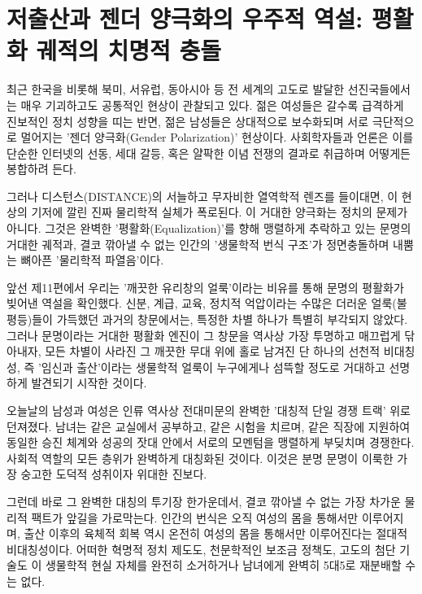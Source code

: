 

\section{저출산과 젠더 양극화의 우주적 역설: 평활화 궤적의 치명적 충돌}
최근 한국을 비롯해 북미, 서유럽, 동아시아 등 전 세계의 고도로 발달한 선진국들에서는 매우 기괴하고도 공통적인 현상이 관찰되고 있다. 젊은 여성들은 갈수록 급격하게 진보적인 정치 성향을 띠는 반면, 젊은 남성들은 상대적으로 보수화되며 서로 극단적으로 멀어지는 '젠더 양극화(Gender Polarization)' 현상이다. 사회학자들과 언론은 이를 단순한 인터넷의 선동, 세대 갈등, 혹은 얄팍한 이념 전쟁의 결과로 취급하며 어떻게든 봉합하려 든다.

그러나 디스턴스(DISTANCE)의 서늘하고 무자비한 열역학적 렌즈를 들이대면, 이 현상의 기저에 깔린 진짜 물리학적 실체가 폭로된다. 이 거대한 양극화는 정치의 문제가 아니다. 그것은 완벽한 '평활화(Equalization)'를 향해 맹렬하게 추락하고 있는 문명의 거대한 궤적과, 결코 깎아낼 수 없는 인간의 '생물학적 번식 구조'가 정면충돌하며 내뿜는 뼈아픈 '물리학적 파열음'이다.

앞선 제11편에서 우리는 '깨끗한 유리창의 얼룩'이라는 비유를 통해 문명의 평활화가 빚어낸 역설을 확인했다. 신분, 계급, 교육, 정치적 억압이라는 수많은 더러운 얼룩(불평등)들이 가득했던 과거의 창문에서는, 특정한 차별 하나가 특별히 부각되지 않았다. 그러나 문명이라는 거대한 평활화 엔진이 그 창문을 역사상 가장 투명하고 매끄럽게 닦아내자, 모든 차별이 사라진 그 깨끗한 무대 위에 홀로 남겨진 단 하나의 선천적 비대칭성, 즉 '임신과 출산'이라는 생물학적 얼룩이 누구에게나 섬뜩할 정도로 거대하고 선명하게 발견되기 시작한 것이다.

오늘날의 남성과 여성은 인류 역사상 전대미문의 완벽한 '대칭적 단일 경쟁 트랙' 위로 던져졌다. 남녀는 같은 교실에서 공부하고, 같은 시험을 치르며, 같은 직장에 지원하여 동일한 승진 체계와 성공의 잣대 안에서 서로의 모멘텀을 맹렬하게 부딪치며 경쟁한다. 사회적 역할의 모든 층위가 완벽하게 대칭화된 것이다. 이것은 분명 문명이 이룩한 가장 숭고한 도덕적 성취이자 위대한 진보다.

그런데 바로 그 완벽한 대칭의 투기장 한가운데서, 결코 깎아낼 수 없는 가장 차가운 물리적 팩트가 앞길을 가로막는다. 인간의 번식은 오직 여성의 몸을 통해서만 이루어지며, 출산 이후의 육체적 회복 역시 온전히 여성의 몸을 통해서만 이루어진다는 절대적 비대칭성이다. 어떠한 혁명적 정치 제도도, 천문학적인 보조금 정책도, 고도의 첨단 기술도 이 생물학적 현실 자체를 완전히 소거하거나 남녀에게 완벽히 5대5로 재분배할 수는 없다.


